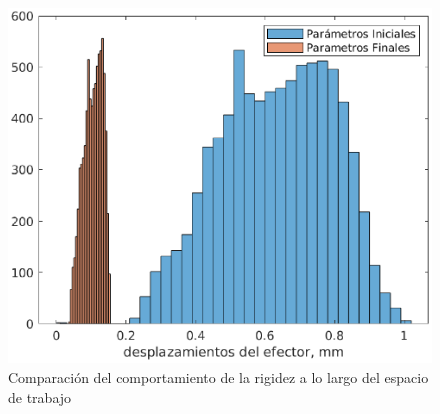 \begin{figure}[hbt!]
    \centering
    \includegraphics[width = 0.75 \textwidth]{Cap4_DisenoBasico/Figura/ComparacionRigidez/DistribucionesDesplazamientos.eps}
    \caption{Comparación del comportamiento de la rigidez a lo largo del espacio de trabajo}
    \label{fig:ComparacionParametros}
\end{figure}

